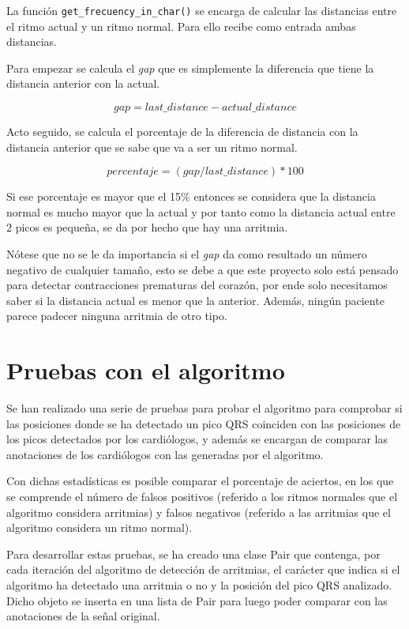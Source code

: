 \FloatBarrier

La función \lstinline{get_frecuency_in_char()} se encarga de calcular las distancias entre el ritmo actual y un ritmo normal. 
Para ello recibe como entrada ambas distancias.

Para empezar se calcula el  \textit{gap}  que es simplemente la diferencia que tiene la distancia anterior con la actual.

\[gap = last\_distance - actual\_distance\]

Acto seguido, se calcula el porcentaje de la diferencia de distancia con la distancia anterior que se sabe que va a ser 
un ritmo normal.

\[percentaje = (gap / last\_distance) * 100\]

Si ese porcentaje es mayor que el 15\% entonces se considera que la distancia normal es mucho mayor que la actual
y por tanto como la distancia actual entre 2 picos es pequeña, se da por hecho que hay una arritmia.

Nótese que no se le da importancia si el  \textit{gap}  da como resultado un número negativo de cualquier tamaño, esto se debe
a que este proyecto solo está pensado para detectar contracciones prematuras del corazón, por ende solo necesitamos 
saber si la distancia actual es menor que la anterior. Además, ningún paciente parece padecer ninguna arritmia de otro
tipo.

\section{Pruebas con el algoritmo}

Se han realizado una serie de pruebas para probar el algoritmo para comprobar si las posiciones donde
se ha detectado un pico QRS coinciden con las posiciones de los picos detectados por los cardiólogos, y además se 
encargan de comparar las anotaciones de los cardiólogos con las generadas por el algoritmo.

Con dichas estadísticas es posible comparar el porcentaje de aciertos, en los que se comprende el número de 
falsos positivos (referido a los ritmos normales que el algoritmo considera arritmias) y 
falsos negativos (referido a las arritmias que el algoritmo considera un ritmo normal).

Para desarrollar estas pruebas, se ha creado una clase Pair que contenga, por cada iteración del algoritmo de detección de arritmias, el carácter que indica si el algoritmo ha detectado una arritmia o no y la posición del pico QRS analizado. Dicho objeto se inserta en una lista de Pair para luego poder comparar con las anotaciones de la señal original.

